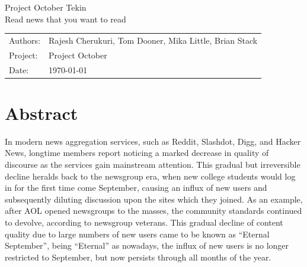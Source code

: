 \documentclass[11pt,letterpaper]{article}
\begin{document}

\newpage
\pagestyle{fancy}
\fancyhf{}
\vspace*{6cm}
\begin{center}
\Huge  {Project October Tekin}\\
\vspace{1cm}
\huge {Read news that you want to read}\\
\vspace{1cm}
\end{center}
\vfill
\begin{flushright}
\begin{tabular}{ll}
Authors: & Rajesh Cherukuri, Tom Dooner, Mika Little, Brian Stack\\
Project: & Project October\\
Date: & \today
\end{tabular}
\end{flushright}

\newpage
\pagestyle{fancy}
\fancyhf{}

\fancyhead[L]{\small \rm \textit{\rightmark}}
\fancyhead[R]{\small \rm \textbf{\thepage}}



\renewcommand{\sectionmark}[1]{\markright{\thesection.\ #1}}
\renewcommand{\headrulewidth}{0.5pt}
\renewcommand{\footrulewidth}{0.5pt}


\tableofcontents
\listoffigures

\newpage
\section{Abstract}

In modern news aggregation services, such as Reddit, Slashdot, Digg, and Hacker News, longtime members report noticing a marked decrease in quality of discourse as the services gain mainstream attention.
This gradual but irreversible decline heralds back to the newsgroup era, when new college students would log in for the first time come September, causing an influx of new users and subsequently diluting discussion upon the sites which they joined.
As an example, after AOL opened newsgroups to the masses, the community standards continued to
devolve, according to newsgroup veterans\cite{september}. This gradual decline of content quality due to
large numbers of new users came to be known as ``Eternal September'', being ``Eternal'' as nowadays,
the influx of new users is no longer restricted to September, but now persists through all months of the year.
\end{document}
